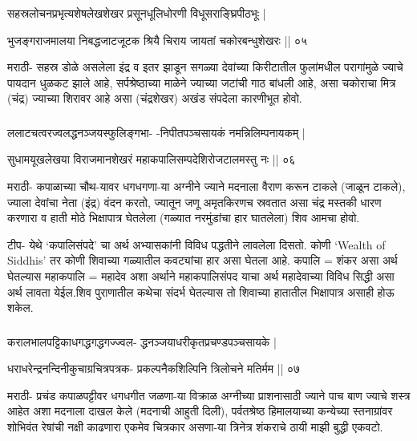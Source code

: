 \begin{frame}[fragile]\frametitle{}
सहस्रलोचनप्रभृत्यशेषलेखशेखर प्रसूनधूलिधोरणी विधूसराङ्घ्रिपीठभूः | 

भुजङ्गराजमालया निबद्धजाटजूटक श्रियै चिराय जायतां चकोरबन्धुशेखरः || ०५ 


मराठी- सहस्र डोळे असलेला इंद्र व इतर झाडून सगळ्या देवांच्या किरीटातील फुलांमधील परागांमुळे ज्याचे पायदान धुळकट झाले आहे, सर्पश्रेष्ठाच्या माळेने ज्याच्या जटांची गाठ बांधली आहे, असा चकोराचा मित्र (चंद्र) ज्याच्या शिरावर आहे असा (चंद्रशेखर) अखंड संपदेला कारणीभूत होवो. 
\end{frame}

\begin{frame}[fragile]\frametitle{}
ललाटचत्वरज्वलद्धनञ्जयस्फुलिङ्गभा- -निपीतपञ्चसायकं नमन्निलिम्पनायकम् | 

सुधामयूखलेखया विराजमानशेखरं महाकपालिसम्पदेशिरोजटालमस्तु नः || ०६ 


मराठी- कपाळाच्या चौथ-यावर धगधगणा-या अग्नीने ज्याने मदनाला वैराण करून टाकले (जाळून टाकले), ज्याला देवांचा नेता (इंद्र) वंदन करतो, ज्यातून जणू अमृतकिरणच स्रवतात असा चंद्र मस्तकी धारण करणारा व हाती मोठे भिक्षापात्र घेतलेला (गळ्यात नरमुंडांचा हार घातलेला) शिव आमचा होवो. 

टीप- येथे `कपालिसंपदे’ चा अर्थ अभ्यासकांनी विविध पद्धतीने लावलेला दिसतो. कोणी ‘Wealth of Siddhis’ तर कोणी शिवाच्या गळ्यातील कवट्यांचा हार असा घेतला आहे. कपालि = शंकर असा अर्थ घेतल्यास महाकपालि = महादेव अशा अर्थाने महाकपालिसंपद याचा अर्थ महादेवाच्या विविध सिद्धी असा अर्थ लावता येईल.शिव पुराणातील कथेचा संदर्भ घेतल्यास तो शिवाच्या हातातील भिक्षापात्र असाही होऊ शकेल. 
\end{frame}

\begin{frame}[fragile]\frametitle{}

करालभालपट्टिकाधगद्धगद्धगज्ज्वल- द्धनञ्जयाधरीकृतप्रचण्डपञ्चसायके |

धराधरेन्द्रनन्दिनीकुचाग्रचित्रपत्रक- प्रकल्पनैकशिल्पिनि त्रिलोचने मतिर्मम || ०७ 


मराठी- प्रचंड कपाळपट्टीवर धगधगीत जळणा-या विक्राळ अग्नीच्या प्राशनासाठी ज्याने पाच बाण ज्याचे शस्त्र आहेत अशा मदनाला दाखल केले (मदनाची आहुती दिली), पर्वतश्रेष्ठ हिमालयाच्या कन्येच्या स्तनाग्रांवर शोभिवंत रेषांची नक्षी काढणारा एकमेव चित्रकार असणा-या त्रिनेत्र शंकराचे ठायी माझी बुद्धी एकवटो. 
\end{frame}

